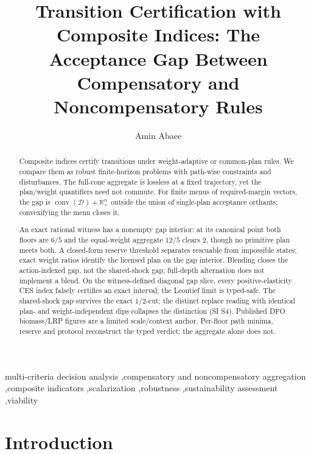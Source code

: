 \documentclass[preprint,11pt,authoryear]{elsarticle}
\theoremstyle{definition}
\theoremstyle{remark}
\newcommand{\conv}{\operatorname{conv}}
\newcommand{\Rp}{\mathbb{R}^n_+}
\begin{document}
\begin{frontmatter}

\title{Transition Certification with Composite Indices: The Acceptance Gap Between Compensatory and Noncompensatory Rules}

\author[1]{Amin Abaee}

\begin{abstract}
Composite indices certify transitions under weight-adaptive or common-plan rules. We compare them as robust finite-horizon problems with path-wise constraints and disturbances. The full-cone aggregate is lossless at a fixed trajectory, yet the plan/weight quantifiers need not commute. For finite menus of required-margin vectors, the gap is $\conv(\mathcal D)+\Rp$ outside the union of single-plan acceptance orthants; convexifying the menu closes it.

An exact rational witness has a nonempty gap interior: at its canonical point both floors are $6/5$ and the equal-weight aggregate $12/5$ clears $2$, though no primitive plan meets both. A closed-form reserve threshold separates rescuable from impossible states; exact weight ratios identify the licensed plan on the gap interior. Blending closes the action-indexed gap, not the shared-shock gap; full-depth alternation does not implement a blend. On the witness-defined diagonal gap slice, every positive-elasticity CES index falsely certifies an exact interval; the Leontief limit is typed-safe. The shared-shock gap survives the exact $1/2$-cut; the distinct replace reading with identical plan- and weight-independent dips collapses the distinction (SI S4). Published DFO biomass/LRP figures are a limited scale/context anchor. Per-floor path minima, reserve and protocol reconstruct the typed verdict; the aggregate alone does not.
\end{abstract}

\begin{keyword}
multi-criteria decision analysis \sep compensatory and noncompensatory aggregation \sep composite indicators \sep scalarization \sep robustness \sep sustainability assessment \sep viability
\end{keyword}

\end{frontmatter}

\section{Introduction}\label{sec:intro}
\end{document}
